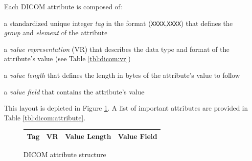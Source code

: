 Each DICOM attribute is composed of:
\begin{tightemize}
   \item a standardized unique integer \emph{tag} in the format (\texttt{XXXX},\texttt{XXXX}) that defines the \emph{group} and \emph{element} of the attribute
   \item a \emph{value representation} (VR) that describes the data type and format of the attribute's value (see Table \ref{tbl:dicom:vr})
   \item a \emph{value length} that defines the length in bytes of the attribute's value to follow
   \item a \emph{value field} that contains the attribute's value
\end{tightemize}
This layout is depicted in Figure \ref{fig:dicom:attribute}.  A list of important attributes are provided in Table \ref{tbl:dicom:attribute}.
\begin{figure}[ht]
   \centering
   \begin{tabular}{|c|c|c|c|}
      \hline
      Tag & VR & Value Length & \hspace*{8ex}Value Field\hspace*{8ex}\\
      \hline
   \end{tabular}%
   \iflatexml
   \else
   \vspace*{-0.75em}
   \fi
   \caption{DICOM attribute structure \label{fig:dicom:attribute}}
\end{figure}
